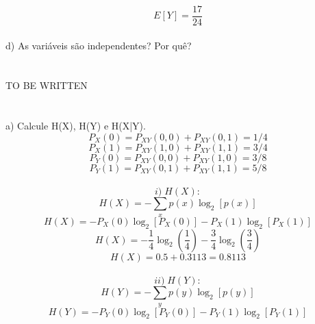 \documentclass[a4paper]{article}
\begin{document}
\begin{equation}
	E[Y] = \frac{17}{24}
\end{equation}
\\
d) As variáveis são independentes? Por quê?
\\
\\
\\
TO BE WRITTEN
\\
\\
\\
a) Calcule H(X), H(Y) e H(X|Y).
\begin{equation}
	P_X(0) = P_{XY}(0,0) + P_{XY}(0,1) = 1/4
\end{equation}
\begin{equation}
	P_X(1) = P_{XY}(1,0) + P_{XY}(1,1) = 3/4
\end{equation}
\begin{equation}
	P_Y(0) = P_{XY}(0,0) + P_{XY}(1,0) = 3/8
\end{equation}
\begin{equation}
	P_Y(1) = P_{XY}(0,1) + P_{XY}(1,1) = 5/8
\end{equation}
\\
\begin{equation}
	i) \; H(X):
\end{equation}
\begin{equation}
	H(X) = -\sum_{x} p(x) \log_2 [p(x)]
\end{equation}
\begin{equation}
	H(X) = -P_X(0) \log_2 [P_X(0)] -P_X(1) \log_2 [P_X(1)]
\end{equation}
\begin{equation}
	H(X) = - \frac{1}{4} \log_2 \left( \frac{1}{4} \right) - \frac{3}{4} \log_2 \left( \frac{3}{4} \right)
\end{equation}
\begin{equation}
	H(X) = 0.5 + 0.3113 = 0.8113
\end{equation}
\\
\begin{equation}
	ii) \; H(Y):
\end{equation}
\begin{equation}
	H(Y) = -\sum_{y} p(y) \log_2 [p(y)]
\end{equation}
\begin{equation}
	H(Y) = -P_Y(0) \log_2 [P_Y(0)] -P_Y(1) \log_2 [P_Y(1)]
\end{equation}
\end{document}
